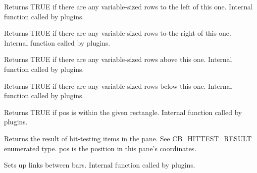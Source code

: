 \label{cbdockpanehasnotfixedbarsleft}


Returns TRUE if there are any variable-sized rows to the left of this one.
Internal function called by plugins.


\label{cbdockpanehasnotfixedbarsright}


Returns TRUE if there are any variable-sized rows to the right of this one.
Internal function called by plugins.


\label{cbdockpanehasnotfixedrowsabove}


Returns TRUE if there are any variable-sized rows above this one.
Internal function called by plugins.


\label{cbdockpanehasnotfixedrowsbelow}


Returns TRUE if there are any variable-sized rows below this one.
Internal function called by plugins.


\label{cbdockpanehaspoint}


Returns TRUE if pos is within the given rectangle.
Internal function called by plugins.


\label{cbdockpanehittestpaneitems}


Returns the result of hit-testing items in the pane.
See CB\_HITTEST\_RESULT enumerated type.
pos is the position in this pane's coordinates.


\label{cbdockpaneinitlinksforrow}


Sets up links between bars.
Internal function called by plugins.


